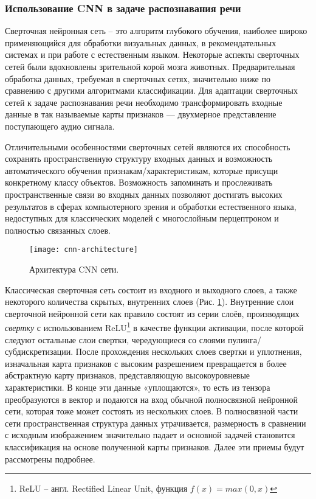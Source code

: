 \subsubsection{Использование CNN в задаче распознавания речи}
Сверточная нейронная сеть -- это алгоритм глубокого обучения, наиболее широко применяющийся для обработки визуальных данных, в рекомендательных системах\cite{cnn-recomendation-system} и при работе с естественным языком\cite{cnn-nlp}. Некоторые аспекты сверточных сетей были вдохновлены зрительной корой мозга животных\cite{cnn-neocognitron}. Предварительная обработка данных, требуемая в сверточных сетях, значительно ниже по сравнению с другими алгоритмами классификации. Для адаптации сверточных сетей к задаче распознавания речи необходимо трансформировать входные данные в так называемые карты признаков --- двухмерное представление поступающего аудио сигнала.

Отличительными особенностями сверточных сетей являются их способность сохранять пространственную структуру входных данных и возможность автоматического обучения признакам/характеристикам, которые присущи конкретному классу объектов. Возможность запоминать и прослеживать пространственные связи во входных данных позволяют достигать высоких результатов в сферах компьютерного зрения и обработки естественного языка, недоступных для классических моделей с многослойным перцептроном и полностью связанных слоев.

\begin{figure}[h]
	\centering
	\texttt{[image: cnn-architecture]}
	\caption{Архитектура CNN сети.}
	\label{fig:cnn-architecture}
\end{figure}

Классическая сверточная сеть состоит из входного и выходного слоев, а также некоторого количества скрытых, внутренних слоев (Рис. \ref{fig:cnn-architecture}). Внутренние слои сверточной нейронной сети как правило состоят из серии слоёв, производящих \emph{свертку} с использованием ReLU\footnote{ReLU -- англ. Rectified Linear Unit, функция $f(x)=max(0,x)$} в качестве функции активации, после которой следуют остальные слои свертки, чередующиеся со слоями пулинга/субдискретизации. После прохождения нескольких слоев свертки и уплотнения, изначальная карта признаков с высоким разрешением превращается в более абстрактную карту признаков, представляющую высокоуровневые характеристики. В конце эти данные «уплощаются», то есть из тензора преобразуются в вектор и подаются на вход обычной полносвязной нейронной сети, которая тоже может состоять из нескольких слоев. В полносвязной части сети пространственная структура данных утрачивается, размерность в сравнении с исходным изображением значительно падает и основной задачей становится классификация на основе полученной карты признаков. Далее эти приемы будут рассмотрены подробнее.

